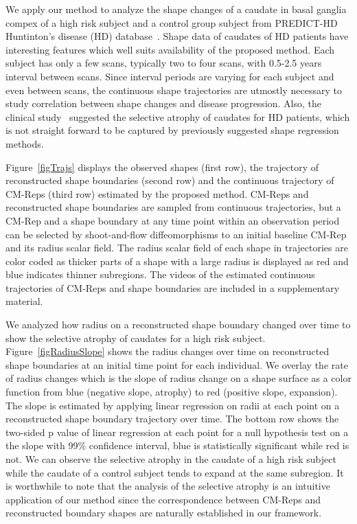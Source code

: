 \documentclass{llncs}
\begin{document}
We apply our method to analyze the shape changes of a caudate in basal ganglia compex of a high risk subject and a control group subject from PREDICT-HD Huntinton's disease (HD) database~\cite{Paulsen2014}.
Shape data of caudates of HD patients have interesting features which well suits availability of the proposed method. Each subject has only a few scans, typically two to four scans, with 0.5-2.5 years interval between scans. Since interval periods are varying for each subject and even between scans, the continuous shape trajectories are utmostly necessary to study correlation between shape changes and disease progression. Also, the clinical study~\cite{Vonsattel1985} suggested the selective atrophy of caudates for HD patients, which is not straight forward to be captured by previously suggested shape regression methods. 

Figure~\ref{figTrajs} displays the observed shapes (first row), the trajectory of reconstructed shape boundaries (second row) and the continuous trajectory of CM-Reps (third row) estimated by the proposed method. 
CM-Reps and reconstructed shape boundaries are sampled from continuous trajectories, but a CM-Rep and a shape boundary at any time point within an observation period can be selected by shoot-and-flow diffeomorphisms to an initial baseline CM-Rep and its radius scalar field. The radius scalar field of each shape in trajectories are color coded as thicker parts of a shape with a large radius is displayed as red and blue indicates thinner subregions. The videos of the estimated continuous trajectories of CM-Reps and shape boundaries are included in a supplementary material. 

We analyzed how radius on a reconstructed shape boundary changed over time to show the selective atrophy of caudates for a high risk subject. 
Figure~\ref{figRadiusSlope} shows the radius changes over time on reconstructed shape boundaries at an initial time point for each individual. 
We overlay the rate of radius changes which is the slope of radius change on a shape surface as a color function from blue (negative slope, atrophy) to red (positive slope, expansion). 
The slope is estimated by applying linear regression on radii at each point on a reconstructed shape boundary trajectory over time. 
The bottom row shows the two-sided p value of linear regression at each point for a null hypothesis test on a the slope with 99\% confidence interval, blue is statistically significant while red is not. 
We can observe the selective atrophy in the caudate of a high risk subject while the caudate of a control subject tends to expand at the same subregion. 
It is worthwhile to note that the analysis of the selective atrophy is an intuitive application of our method since the correspondence between CM-Reps and reconstructed boundary shapes are naturally established in our framework. 
\end{document}
